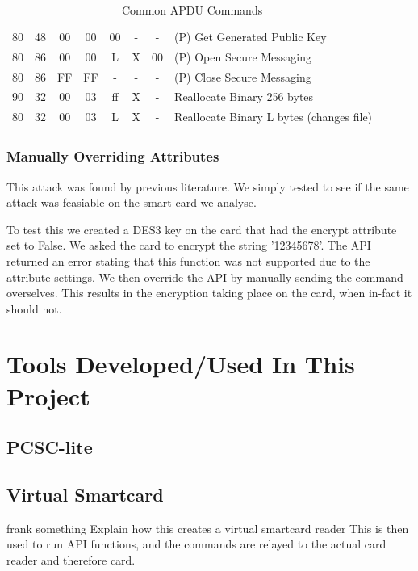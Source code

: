 \documentclass[bsc,frontabs,twoside,singlespacing,parskip,deptreport]{infthesis}     %
\begin{document}
\begin{table}[H]
\begin{tabular}{|c|c|c|c|c|c|c|p{8cm}|}
80  & 48  & 00 & 00 & 00  & -          & -  & (P) Get Generated Public Key\\
80  & 86  & 00 & 00 & L   & X          & 00 & (P) Open Secure Messaging\\
80  & 86  & FF & FF & -   & -          & -  & (P) Close Secure Messaging\\
\hline
90  & 32  & 00 & 03 & ff  & X          & -  &  Reallocate Binary 256 bytes\\
80  & 32  & 00 & 03 & L   & X          & -  &  Reallocate Binary L bytes (changes file)\\
\hline
\end{tabular}
\caption{Common APDU Commands}
\end{table} 


\subsection{Manually Overriding Attributes}
This attack was found by previous literature. We simply tested to see if the same attack was feasiable on the smart card we analyse. 

To test this we created a DES3 key on the card that had the encrypt attribute set to False. We asked the card to encrypt the string '12345678'. The API returned an error stating that this function was not supported due to the attribute settings. We then override the API by manually sending the command overselves. This results in the encryption taking place on the card, when in-fact it should not.



\chapter{Tools Developed/Used In This Project}



\section{PCSC-lite}

\section{Virtual Smartcard}
frank something
Explain how this creates a virtual smartcard reader
This is then used to run API functions, and the commands are relayed to the actual card reader and therefore card.
\end{document}
